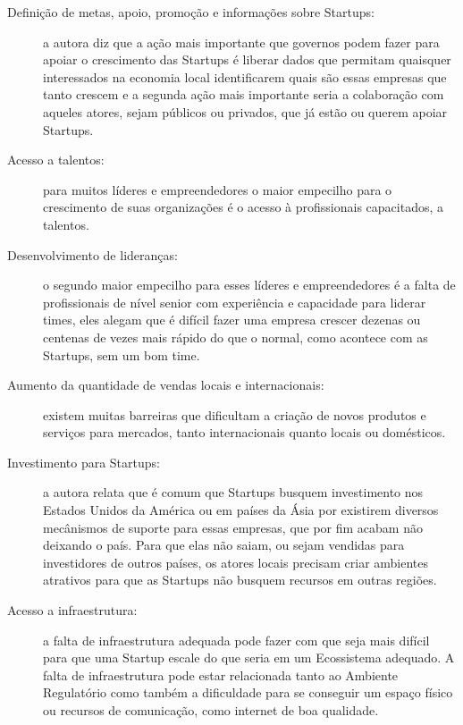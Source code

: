 \begin{description}
	\item [Definição de metas, apoio, promoção e informações sobre Startups:] a autora diz que a ação mais importante que governos podem fazer para apoiar o crescimento das Startups é liberar dados que permitam quaisquer interessados na economia local identificarem quais são essas empresas que tanto crescem e a segunda ação mais importante seria a colaboração com aqueles atores, sejam públicos ou privados, que já estão ou querem apoiar Startups. 

	\item [Acesso a talentos:] para muitos líderes e empreendedores o maior empecilho para o crescimento de suas organizações é o acesso à profissionais capacitados, a talentos. 

	\item [Desenvolvimento de lideranças:] o segundo maior empecilho para esses líderes e empreendedores é a falta de profissionais de nível senior com experiência e capacidade para liderar times, eles alegam que é difícil fazer uma empresa crescer dezenas ou centenas de vezes mais rápido do que o normal, como acontece com as Startups, sem um bom time.

	\item [Aumento da quantidade de vendas locais e internacionais:] existem muitas barreiras que dificultam a criação de novos produtos e serviços para mercados, tanto internacionais quanto locais ou domésticos.

	\item [Investimento para Startups:] a autora relata que é comum que Startups busquem investimento nos Estados Unidos da América ou em países da Ásia por existirem diversos mecânismos de suporte para essas empresas, que por fim acabam não deixando o país. Para que elas não saiam, ou sejam vendidas para investidores de outros países, os atores locais precisam criar ambientes atrativos para que as Startups não busquem recursos em outras regiões.

	\item [Acesso a infraestrutura:] a falta de infraestrutura adequada pode fazer com que seja mais difícil para que uma Startup escale do que seria em um Ecossistema adequado. A falta de infraestrutura pode estar relacionada tanto ao Ambiente Regulatório como também a dificuldade para se conseguir um espaço físico ou recursos de comunicação, como internet de boa qualidade.

\end{description}


